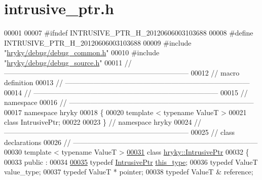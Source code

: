 \hypertarget{intrusive__ptr_8h_source}{\section{intrusive\-\_\-ptr.\-h}
}

\begin{DoxyCode}
00001 
00007 \textcolor{preprocessor}{#ifndef INTRUSIVE\_PTR\_H\_20120606003103688}
00008 \textcolor{preprocessor}{}\textcolor{preprocessor}{#define INTRUSIVE\_PTR\_H\_20120606003103688}
00009 \textcolor{preprocessor}{}\textcolor{preprocessor}{#include "\hyperlink{debug__common_8h}{hryky/debug/debug_common.h}"}
00010 \textcolor{preprocessor}{#include "\hyperlink{debug__source_8h}{hryky/debug/debug_source.h}"}
00011 \textcolor{comment}{//
      ------------------------------------------------------------------------------}
00012 \textcolor{comment}{// macro definition}
00013 \textcolor{comment}{//
      ------------------------------------------------------------------------------}
00014 \textcolor{comment}{//
      ------------------------------------------------------------------------------}
00015 \textcolor{comment}{// namespace}
00016 \textcolor{comment}{//
      ------------------------------------------------------------------------------}
00017 \textcolor{keyword}{namespace }hryky
00018 \{
00020     \textcolor{keyword}{template} < \textcolor{keyword}{typename} ValueT >
00021     \textcolor{keyword}{class }IntrusivePtr;
00022 
00023 \} \textcolor{comment}{// namespace hryky}
00024 \textcolor{comment}{//
      ------------------------------------------------------------------------------}
00025 \textcolor{comment}{// class declarations}
00026 \textcolor{comment}{//
      ------------------------------------------------------------------------------}
00030 \textcolor{comment}{}\textcolor{keyword}{template} < \textcolor{keyword}{typename} ValueT >
\hypertarget{intrusive__ptr_8h_source_l00031}{}\hyperlink{classhryky_1_1_intrusive_ptr}{00031} \textcolor{keyword}{class }\hyperlink{classhryky_1_1_intrusive_ptr}{hryky::IntrusivePtr}
00032 \{
00033 \textcolor{keyword}{public} :
00034 
\hypertarget{intrusive__ptr_8h_source_l00035}{}\hyperlink{classhryky_1_1_intrusive_ptr_a0fb00a7eafa8939e21653f677d1b2989}{00035}     \textcolor{keyword}{typedef} \hyperlink{classhryky_1_1_intrusive_ptr}{IntrusivePtr}        \hyperlink{classhryky_1_1_intrusive_ptr_a0fb00a7eafa8939e21653f677d1b2989}{this_type};
00036     \textcolor{keyword}{typedef} ValueT              value\_type;
00037     \textcolor{keyword}{typedef} ValueT *            pointer;
00038     \textcolor{keyword}{typedef} ValueT &            reference;

\end{DoxyCode}
